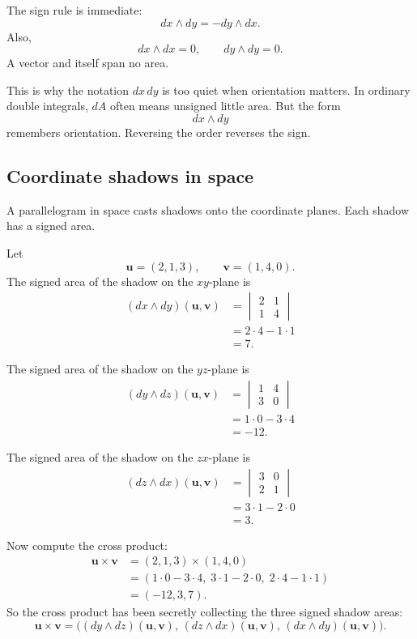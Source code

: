 The sign rule is immediate:
\[
\boxed{
    dx\wedge dy=-dy\wedge dx.
}
\]
Also,
\[
\boxed{
    dx\wedge dx=0,
    \qquad
    dy\wedge dy=0.
}
\]
A vector and itself span no area.

This is why the notation \(dx\,dy\) is too quiet when orientation matters.  In ordinary
double integrals, \(dA\) often means unsigned little area.  But the form
\[
    dx\wedge dy
\]
remembers orientation.  Reversing the order reverses the sign.

\subsection{Coordinate shadows in space}

A parallelogram in space casts shadows onto the coordinate planes.  Each shadow has
a signed area.

Let
\[
    \mathbf u=(2,1,3),
    \qquad
    \mathbf v=(1,4,0).
\]
The signed area of the shadow on the \(xy\)-plane is
\[
\begin{aligned}
(dx\wedge dy)(\mathbf u,\mathbf v)
&=
\begin{vmatrix}
2&1\\
1&4
\end{vmatrix}\\
&=
2\cdot4-1\cdot1\\
&=
7.
\end{aligned}
\]

The signed area of the shadow on the \(yz\)-plane is
\[
\begin{aligned}
(dy\wedge dz)(\mathbf u,\mathbf v)
&=
\begin{vmatrix}
1&4\\
3&0
\end{vmatrix}\\
&=
1\cdot0-3\cdot4\\
&=
-12.
\end{aligned}
\]

The signed area of the shadow on the \(zx\)-plane is
\[
\begin{aligned}
(dz\wedge dx)(\mathbf u,\mathbf v)
&=
\begin{vmatrix}
3&0\\
2&1
\end{vmatrix}\\
&=
3\cdot1-2\cdot0\\
&=
3.
\end{aligned}
\]

Now compute the cross product:
\[
\begin{aligned}
\mathbf u\times\mathbf v
&=
(2,1,3)\times(1,4,0)\\
&=
(1\cdot0-3\cdot4,\;3\cdot1-2\cdot0,\;2\cdot4-1\cdot1)\\
&=
(-12,3,7).
\end{aligned}
\]
So the cross product has been secretly collecting the three signed shadow areas:
\[
\boxed{
\mathbf u\times\mathbf v
=
\bigl(
(dy\wedge dz)(\mathbf u,\mathbf v),\,
(dz\wedge dx)(\mathbf u,\mathbf v),\,
(dx\wedge dy)(\mathbf u,\mathbf v)
\bigr).
}
\]

